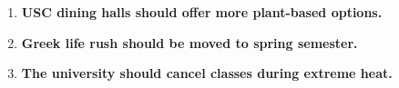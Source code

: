 \documentclass[12pt]{article}
\begin{document}
\begin{enumerate}[leftmargin=*]
    \item \textbf{USC dining halls should offer more plant-based options.}

    \vspace{2.5in}

    \item \textbf{Greek life rush should be moved to spring semester.}

    \vspace{2.5in}

    \item \textbf{The university should cancel classes during extreme heat.}

    \vspace{2.5in}
\end{enumerate}
\end{document}
